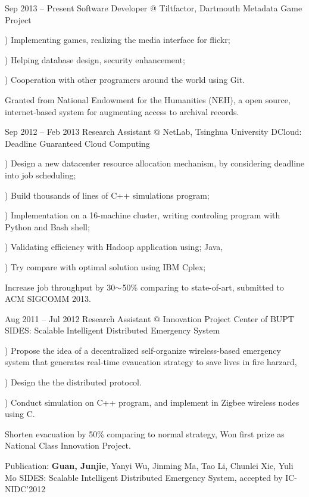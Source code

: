 \documentclass{tccv}
\begin{document}
\begin{eventlist}

\item{Sep 2013 -- Present}
     {Software Developer @ Tiltfactor, Dartmouth}
     {Metadata Game Project}
     
     ) Implementing games, realizing the media interface for flickr;
     
     ) Helping database design, security enhancement;
     
     ) Cooperation with other programers around the world using Git.
     
     Granted from National Endowment for the Humanities (NEH), a open source, internet‐based system for augmenting access to archival records.
     
     
\item{Sep 2012 -- Feb 2013}
     {Research Assistant @ NetLab, Tsinghua University}
     {DCloud: Deadline Guaranteed Cloud Computing}
     
     ) Design a new datacenter resource allocation mechanism, by considering deadline into job scheduling;
     
     ) Build thousands of lines of C++ simulations program;
     
     ) Implementation on a 16-machine cluster, writing controling  program with Python and Bash shell;
     
     ) Validating efficiency with Hadoop application using; Java, 
     
     ) Try compare with optimal solution using IBM Cplex;

     Increase job throughput by 30$\scriptsize{\sim}$50\% comparing to state-of-art, submitted to ACM SIGCOMM 2013.
     
\item{Aug 2011 -- Jul 2012}
     {Research Assistant @ Innovation Project Center of BUPT}
     {SIDES: Scalable Intelligent Distributed Emergency System}
     
     ) Propose the idea of a decentralized self-organize wireless-based emergency system that generates real-time evaucation strategy to save lives in fire harzard, 
     
     ) Design the the distributed protocol.
     
     ) Conduct simulation on C++ program, and implement in Zigbee wireless nodes using C.
     
Shorten evacuation by 50\% comparing to normal strategy, Won first prize as National Class Innovation Project.

Publication: \textbf{Guan, Junjie}, Yanyi Wu, Jinming Ma, Tao Li, Chunlei Xie, Yuli Mo SIDES: Scalable Intelligent Distributed Emergency System, accepted by IC-NIDC’2012
     
\end{eventlist}
\end{document}
